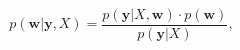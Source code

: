 \begin{equation}
\label{eq:bayestheoremcontinuous}
p(\mathbf{w | y }, X) = \frac{p(\mathbf{y} | X, \mathbf{w}) \cdot
p(\mathbf{w})}{p(\mathbf{y} | X)},
\end{equation}
